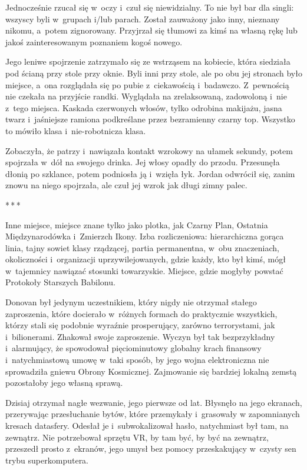 \documentclass[oneside,polish,11pt,sfheadings]{mwbk}
\newcommand{\threeast}{\bigskip\par\centerline{*\,*\,*}\medskip\par}%
\begin{document}
Jednocześnie rzucał się w~oczy i~czuł się niewidzialny. To nie był bar
dla singli: wszyscy byli w~grupach i/lub parach. Został zauważony jako
inny, nieznany nikomu, a~potem zignorowany. Przyjrzał się tłumowi za
kimś na własną rękę lub jakoś zainteresowanym poznaniem kogoś nowego.

Jego leniwe spojrzenie zatrzymało się ze wstrząsem na kobiecie, która
siedziała pod ścianą przy stole przy oknie. Byli inni przy stole, ale po
obu jej stronach było miejsce, a~ona rozglądała się po pubie z~ciekawością i~badawczo. Z~pewnością nie czekała na przyjście randki.
Wyglądała na zrelaksowaną, zadowoloną i~nie z~tego miejsca. Kaskada
czerwonych włosów, tylko odrobina makijażu, jasna twarz i~jaśniejsze
ramiona podkreślane przez bezramienny czarny top. Wszystko to mówiło
klasa i~nie-robotnicza klasa.

Zobaczyła, że patrzy i~nawiązała kontakt wzrokowy na ułamek sekundy,
potem spojrzała w~dół na swojego drinka. Jej włosy opadły do przodu.
Przesunęła dłonią po szklance, potem podniosła ją i~wzięła łyk. Jordan
odwrócił się, zanim znowu na niego spojrzała, ale czuł jej wzrok jak
długi zimny palec.
  \threeast 

Inne miejsce, miejsce znane tylko jako plotka, jak Czarny Plan, Ostatnia
Międzynarodówka i~Zmierzch Ikony. Izba rozliczeniowa: hierarchiczna
gorąca linia, tajny sowiet klasy rządzącej, partia permanentna, w~obu
znaczeniach, okoliczności i~organizacji uprzywilejowanych, gdzie każdy,
kto był kimś, mógł w~tajemnicy nawiązać stosunki towarzyskie. Miejsce,
gdzie mogłyby powstać Protokoły Starszych Babilonu.

Donovan był jedynym uczestnikiem, który nigdy nie otrzymał stałego
zaproszenia, które docierało w~różnych formach do praktycznie
wszystkich, którzy stali się podobnie wyraźnie prosperujący, zarówno
terrorystami, jak i~bilionerami. Zhakował swoje zaproszenie. Wyczyn był
tak bezprzykładny i~alarmujący, że spowodował pięciominutowy globalny
krach finansowy i~natychmiastową umowę w~taki sposób, by jego wojna
elektroniczna nie sprowadziła gniewu Obrony Kosmicznej. Zajmowanie się
bardziej lokalną zemstą pozostałoby jego własną sprawą.

Dzisiaj otrzymał nagłe wezwanie, jego pierwsze od lat. Błysnęło na jego
ekranach, przerywając przesłuchanie bytów, które przemykały i~grasowały
w zapomnianych kresach datasfery. Odesłał je i~subwokalizował hasło,
natychmiast był tam, na zewnątrz. Nie potrzebował sprzętu VR, by tam
być, by być na zewnątrz, przeszedł prosto z~ekranów, jego umysł bez
pomocy przeskakujący w~czysty sen trybu superkomputera.
\end{document}
